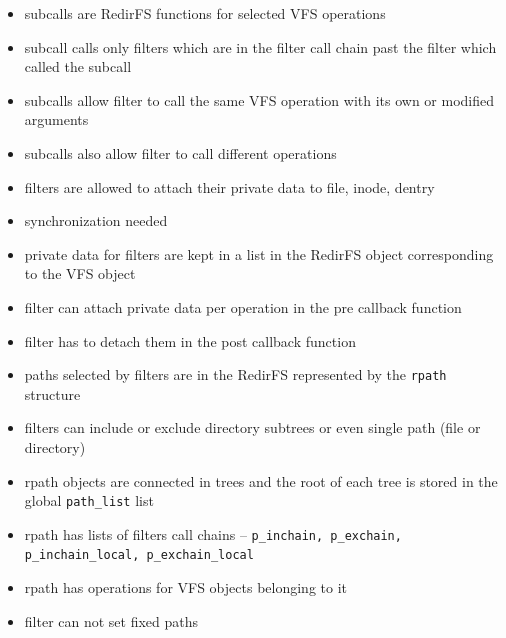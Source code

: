 \documentclass[30pt,a4paper,landscape,headrule,footrule]{foils}
\begin{document}
\begin{itemize}
\item subcalls are RedirFS functions for selected VFS operations
\item subcall calls only filters which are in the filter call chain past the
filter which called the subcall
\item subcalls allow filter to call the same VFS operation with its own or
modified arguments
\item subcalls also allow filter to call different operations
\end{itemize}

\begin{itemize}
\item filters are allowed to attach their private data to file,
inode, dentry
\item synchronization needed
\item private data for filters are kept in a list in the RedirFS object
corresponding to the VFS object
\item filter can attach private data per operation in the pre callback function
\item filter has to detach them in the post callback function
\end{itemize}

\begin{itemize}
\item paths selected by filters are in the RedirFS represented by the
\texttt{rpath} structure
\item filters can include or exclude directory subtrees or even single path
(file or directory)
\item rpath objects are connected in trees and the root of each tree
is stored in the global \texttt{path\_list} list
\end{itemize}

\begin{itemize}
\item rpath has lists of filters call chains -- \texttt{p\_inchain, p\_exchain,
p\_inchain\_local, p\_exchain\_local}
\item rpath has operations for VFS objects belonging to it
\item filter can not set fixed paths
\end{itemize}
\end{document}

